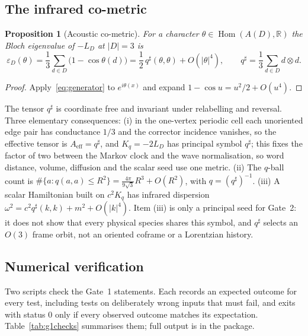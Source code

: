 \documentclass[11pt]{article}
\newtheorem{proposition}[theorem]{Proposition}
\theoremstyle{definition}
\theoremstyle{remark}
\newcommand{\R}{\mathbb{R}}
\begin{document}
\subsection{The infrared co-metric}
\label{sec:cometric}

\begin{proposition}[Acoustic co-metric]
\label{prop:cometric}
For a character $\theta\in\operatorname{Hom}(A(D),\R)$ the Bloch eigenvalue of $-L_D$ at
$|D|=3$ is
\begin{equation}
\varepsilon_D(\theta)=\frac13\sum_{d\in D}\bigl(1-\cos\theta(d)\bigr)
=\frac12\,q^\sharp(\theta,\theta)+O(|\theta|^4),\qquad
q^\sharp=\frac13\sum_{d\in D}d\otimes d .
\label{eq:cometric}
\end{equation}
\end{proposition}

\begin{proof}
Apply~\eqref{eq:generator} to $e^{i\theta(x)}$ and expand $1-\cos u=u^2/2+O(u^4)$.
\end{proof}

The tensor $q^\sharp$ is coordinate free and invariant under relabelling and
reversal. Three elementary consequences: (i) in the one-vertex periodic cell each
unoriented edge pair has conductance $1/3$ and the corrector incidence vanishes, so the
effective tensor is $A_{\mathrm{eff}}=q^\sharp$, and $K_q=-2L_D$ has principal symbol
$q^\sharp$; this fixes the factor of two between the Markov clock and the wave
normalisation, so word distance, volume, diffusion and the scalar seed use one metric.
(ii) The $q$-ball count is $\#\{a: q(a,a)\le R^2\}=\frac{4\pi}{9\sqrt3}R^3+O(R^2)$, with
$q=(q^\sharp)^{-1}$. (iii) A scalar Hamiltonian built on $c^2K_q$ has infrared dispersion
$\omega^2=c^2q^\sharp(k,k)+m^2+O(|k|^4)$. Item (iii) is only a principal seed for Gate~2:
it does not show that every physical species shares this symbol, and $q^\sharp$ selects
an $O(3)$ frame orbit, not an oriented coframe or a Lorentzian history.

\subsection{Numerical verification}
\label{sec:g1numerics}

Two scripts check the Gate~1 statements. Each records an expected outcome for every
test, including tests on deliberately wrong inputs that must fail, and exits with status
$0$ only if every observed outcome matches its expectation. Table~\ref{tab:g1checks}
summarises them; full output is in the package.
\end{document}
